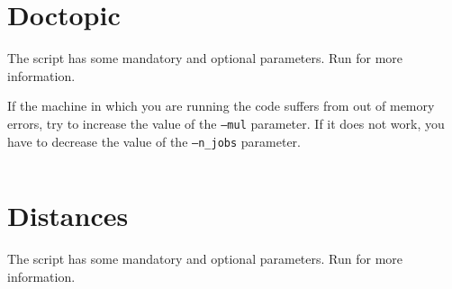 \inputminted{Python}{../code/data_preparation.py}

\pagebreak
\section{Doctopic} \label{doctopic_code}
The script has some mandatory and optional parameters.
Run  for more information.

If the machine in which you are running the code suffers from out of memory errors,
try to increase the value of the \texttt{--mul} parameter.
If it does not work, you have to decrease the value of the \texttt{--n\_jobs} parameter.

\inputminted{Python}{../code/doctopic.py}

\pagebreak
\section{Distances}
The script has some mandatory and optional parameters.
Run  for more information.

\inputminted{Python}{../code/distances.py}